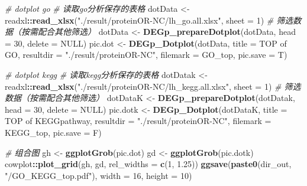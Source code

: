\documentclass[
]{book}
\newenvironment{Shaded}{\begin{snugshade}}{\end{snugshade}}
\newcommand{\AttributeTok}[1]{\textcolor[rgb]{0.13,0.29,0.53}{#1}}
\newcommand{\CommentTok}[1]{\textcolor[rgb]{0.56,0.35,0.01}{\textit{#1}}}
\newcommand{\ConstantTok}[1]{\textcolor[rgb]{0.56,0.35,0.01}{#1}}
\newcommand{\DecValTok}[1]{\textcolor[rgb]{0.00,0.00,0.81}{#1}}
\newcommand{\FloatTok}[1]{\textcolor[rgb]{0.00,0.00,0.81}{#1}}
\newcommand{\FunctionTok}[1]{\textcolor[rgb]{0.13,0.29,0.53}{\textbf{#1}}}
\newcommand{\NormalTok}[1]{#1}
\newcommand{\OtherTok}[1]{\textcolor[rgb]{0.56,0.35,0.01}{#1}}
\newcommand{\SpecialCharTok}[1]{\textcolor[rgb]{0.81,0.36,0.00}{\textbf{#1}}}
\newcommand{\StringTok}[1]{\textcolor[rgb]{0.31,0.60,0.02}{#1}}
\begin{document}
\begin{Shaded}
\begin{Highlighting}[]
\CommentTok{\# dotplot go}
\CommentTok{\# 读取go分析保存的表格}
\NormalTok{dotData }\OtherTok{\textless{}{-}}\NormalTok{ readxl}\SpecialCharTok{::}\FunctionTok{read\_xlsx}\NormalTok{(}\StringTok{"./result/proteinOR{-}NC/lh\_go.all.xlsx"}\NormalTok{, }\AttributeTok{sheet =} \DecValTok{1}\NormalTok{)}
\CommentTok{\# 筛选数据（按需配合其他筛选）}
\NormalTok{dotData }\OtherTok{\textless{}{-}} \FunctionTok{DEGp\_prepareDotplot}\NormalTok{(dotData, }\AttributeTok{head =} \DecValTok{30}\NormalTok{, }\AttributeTok{delete =} \ConstantTok{NULL}\NormalTok{)}
\NormalTok{pic.dot }\OtherTok{\textless{}{-}} \FunctionTok{DEGp\_Dotplot}\NormalTok{(dotData, }\AttributeTok{title =} \StringTok{\textquotesingle{}TOP of GO\textquotesingle{}}\NormalTok{, }
                        \AttributeTok{resultdir =} \StringTok{"./result/proteinOR{-}NC"}\NormalTok{, }\AttributeTok{filemark =} \StringTok{\textquotesingle{}GO\_top\textquotesingle{}}\NormalTok{, }
                        \AttributeTok{pic.save =}\NormalTok{ T)}

\CommentTok{\# dotplot kegg}
\CommentTok{\# 读取kegg分析保存的表格}
\NormalTok{dotDatak }\OtherTok{\textless{}{-}}\NormalTok{ readxl}\SpecialCharTok{::}\FunctionTok{read\_xlsx}\NormalTok{(}\StringTok{"./result/proteinOR{-}NC/lh\_kegg.all.xlsx"}\NormalTok{, }\AttributeTok{sheet =} \DecValTok{1}\NormalTok{)}
\CommentTok{\# 筛选数据（按需配合其他筛选）}
\NormalTok{dotDataK }\OtherTok{\textless{}{-}} \FunctionTok{DEGp\_prepareDotplot}\NormalTok{(dotDatak, }\AttributeTok{head =} \DecValTok{30}\NormalTok{, }\AttributeTok{delete =} \ConstantTok{NULL}\NormalTok{)}
\NormalTok{pic.dotk }\OtherTok{\textless{}{-}} \FunctionTok{DEGp\_Dotplot}\NormalTok{(dotDataK, }\AttributeTok{title =} \StringTok{\textquotesingle{}TOP of KEGGpathway\textquotesingle{}}\NormalTok{, }
                         \AttributeTok{resultdir =} \StringTok{"./result/proteinOR{-}NC"}\NormalTok{, }\AttributeTok{filemark =} \StringTok{\textquotesingle{}KEGG\_top\textquotesingle{}}\NormalTok{, }
                         \AttributeTok{pic.save =}\NormalTok{ F)}

\CommentTok{\# 组合图}
\NormalTok{gh }\OtherTok{\textless{}{-}} \FunctionTok{ggplotGrob}\NormalTok{(pic.dot)}
\NormalTok{gd }\OtherTok{\textless{}{-}} \FunctionTok{ggplotGrob}\NormalTok{(pic.dotk)}
\NormalTok{cowplot}\SpecialCharTok{::}\FunctionTok{plot\_grid}\NormalTok{(gh, gd, }\AttributeTok{rel\_widths =} \FunctionTok{c}\NormalTok{(}\DecValTok{1}\NormalTok{, }\FloatTok{1.25}\NormalTok{))}
\FunctionTok{ggsave}\NormalTok{(}\FunctionTok{paste0}\NormalTok{(dir\_out, }\StringTok{"/GO\_KEGG\_top.pdf"}\NormalTok{), }\AttributeTok{width =} \DecValTok{16}\NormalTok{, }\AttributeTok{height =} \DecValTok{10}\NormalTok{)}
\end{Highlighting}
\end{Shaded}
\end{document}
